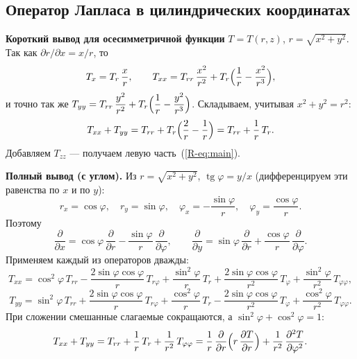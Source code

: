 \documentclass[a4paper,12pt]{article}
\newcommand{\rf}[1]{(\ref*{R-#1})}
\newcommand{\pd}[2]{\dfrac{\partial #1}{\partial #2}}
\newcommand{\pdd}[2]{\dfrac{\partial^2 #1}{\partial #2^2}}
\begin{document}
\subsection{Оператор Лапласа в цилиндрических координатах}
\label{der:lap}

\textbf{Короткий вывод для осесимметричной функции} $T=T(r,z)$,
$r=\sqrt{x^2+y^2}$. Так как $\partial r/\partial x=x/r$, то
\[
T_x=T_r\,\frac{x}{r},\qquad
T_{xx}=T_{rr}\,\frac{x^2}{r^2}+T_r\Bigl(\frac{1}{r}-\frac{x^2}{r^3}\Bigr),
\]
и точно так же
$T_{yy}=T_{rr}\,\dfrac{y^2}{r^2}+T_r\Bigl(\dfrac{1}{r}-\dfrac{y^2}{r^3}\Bigr)$.
Складываем, учитывая $x^2+y^2=r^2$:
\[
T_{xx}+T_{yy}=T_{rr}+T_r\Bigl(\frac{2}{r}-\frac{1}{r}\Bigr)=T_{rr}+\frac{1}{r}\,T_r .
\]
Добавляем $T_{zz}$ — получаем левую часть~\rf{eq:main}.

\textbf{Полный вывод (с углом).} Из $r=\sqrt{x^2+y^2}$,
$\operatorname{tg}\varphi=y/x$ (дифференцируем эти равенства по $x$ и по
$y$):
\[
r_x=\cos\varphi,\quad r_y=\sin\varphi,\quad
\varphi_x=-\frac{\sin\varphi}{r},\quad \varphi_y=\frac{\cos\varphi}{r}.
\]
Поэтому
\[
\pd{}{x}=\cos\varphi\,\pd{}{r}-\frac{\sin\varphi}{r}\,\pd{}{\varphi},\qquad
\pd{}{y}=\sin\varphi\,\pd{}{r}+\frac{\cos\varphi}{r}\,\pd{}{\varphi}.
\]
Применяем каждый из операторов дважды:
\[
T_{xx}=\cos^2\!\varphi\,T_{rr}-\frac{2\sin\varphi\cos\varphi}{r}\,T_{r\varphi}
+\frac{\sin^2\!\varphi}{r}\,T_r+\frac{2\sin\varphi\cos\varphi}{r^2}\,T_\varphi
+\frac{\sin^2\!\varphi}{r^2}\,T_{\varphi\varphi},
\]
\[
T_{yy}=\sin^2\!\varphi\,T_{rr}+\frac{2\sin\varphi\cos\varphi}{r}\,T_{r\varphi}
+\frac{\cos^2\!\varphi}{r}\,T_r-\frac{2\sin\varphi\cos\varphi}{r^2}\,T_\varphi
+\frac{\cos^2\!\varphi}{r^2}\,T_{\varphi\varphi}.
\]
При сложении смешанные слагаемые сокращаются, а
$\sin^2\!\varphi+\cos^2\!\varphi=1$:
\[
T_{xx}+T_{yy}=T_{rr}+\frac1r\,T_r+\frac{1}{r^2}\,T_{\varphi\varphi}
=\frac1r\,\pd{}{r}\Bigl(r\,\pd{T}{r}\Bigr)+\frac{1}{r^2}\,\pdd{T}{\varphi}.
\]
\end{document}
